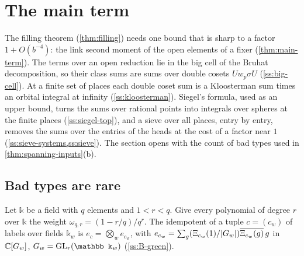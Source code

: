 \section{The main term}\label{sec:main-term}

The filling theorem (\cref{thm:filling}) needs one bound that is sharp to a factor $1+O(b^{-4})$: the link second moment of the open elements of a fixer
(\cref{thm:main-term}). The terms over an open reduction lie in the big cell of the Bruhat decomposition, so their class sums are sums over double cosets
$Uw_p\sigma U$ (\cref{ss:big-cell}). At a finite set of places each double coset sum is a Kloosterman sum times an orbital integral at infinity
(\cref{ss:kloosterman}). Siegel's formula, used as an upper bound, turns the sums over rational points into integrals over spheres at the finite places
(\cref{ss:siegel-top}), and a sieve over all places, entry by entry, removes the sums over the entries of the heads at the cost of a factor near $1$
(\cref{ss:sieve-systems,ss:sieve}). The section opens with the count of bad types used in \cref{thm:spanning-inputs}(b).

\subsection{Bad types are rare}\label{ss:bad-types}
Let $\mathbb k$ be a field with $q$ elements and $1<r<q$. Give every polynomial of degree $r$ over $\mathbb k$ the weight $\omega_{q,r}=(1-r/q)/q^r$. The idempotent of a tuple $c=(c_w)$
of labels over fields $\mathbb k_w$ is $e_c=\bigotimes_we_{c_w}$, with $e_{c_w}=\sum_g(\Xi_{c_w}(1)/\lvert G_w\rvert)\overline{\Xi_{c_w}(g)}\,g$ in $\mathbb{C}[G_w]$, $G_w=\GL_r(\mathbb k_w)$ (\cref{ss:B-green}).


